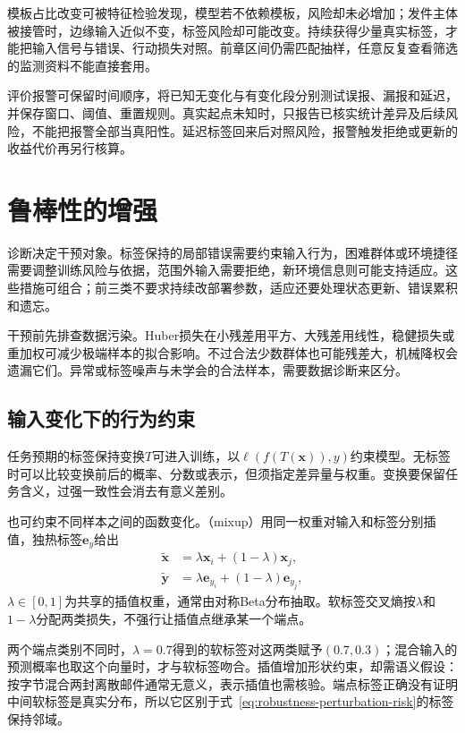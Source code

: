 模板占比改变可被特征检验发现，模型若不依赖模板，风险却未必增加；发件主体被接管时，边缘输入近似不变，标签风险却可能改变。持续获得少量真实标签，才能把输入信号与错误、行动损失对照。前章区间仍需匹配抽样，任意反复查看筛选的监测资料不能直接套用。

评价报警可保留时间顺序，将已知无变化与有变化段分别测试误报、漏报和延迟，并保存窗口、阈值、重置规则。真实起点未知时，只报告已核实统计差异及后续风险，不能把报警全部当真阳性。延迟标签回来后对照风险，报警触发拒绝或更新的收益代价再另行核算。

\section{鲁棒性的增强}
\label{sec:robustness-enhancement}

诊断决定干预对象。标签保持的局部错误需要约束输入行为，困难群体或环境捷径需要调整训练风险与依据，范围外输入需要拒绝，新环境信息则可能支持适应。这些措施可组合；前三类不要求持续改部署参数，适应还要处理状态更新、错误累积和遗忘。

干预前先排查数据污染。Huber损失在小残差用平方、大残差用线性，稳健损失或重加权可减少极端样本的拟合影响。不过合法少数群体也可能残差大，机械降权会遗漏它们。异常或标签噪声与未学会的合法样本，需要数据诊断来区分。

\subsection{输入变化下的行为约束}
\label{sec:robustness-local-enhancement}

任务预期的标签保持变换$T$可进入训练，以$\ell(f(T(\bm{x})),y)$约束模型。无标签时可以比较变换前后的概率、分数或表示，但须指定差异量与权重。变换要保留任务含义，过强一致性会消去有意义差别。

也可约束不同样本之间的函数变化。（mixup）用同一权重对输入和标签分别插值，独热标签$\bm{e}_y$给出
\begin{equation}
 \begin{aligned}
  \widetilde{\bm{x}}&=\lambda\bm{x}_i+(1-\lambda)\bm{x}_j,\\
  \widetilde{\bm{y}}&=\lambda\bm{e}_{y_i}
                         +(1-\lambda)\bm{e}_{y_j},
 \end{aligned}
 \label{eq:robustness-mixup}
\end{equation}
$\lambda\in[0,1]$为共享的插值权重，通常由对称Beta分布抽取。软标签交叉熵按$\lambda$和$1-\lambda$分配两类损失，不强行让插值点继承某一个端点。

两个端点类别不同时，$\lambda=0.7$得到的软标签对这两类赋予$(0.7,0.3)$；混合输入的预测概率也取这个向量时，才与软标签吻合。插值增加形状约束，却需语义假设：按字节混合两封离散邮件通常无意义，表示插值也需核验。端点标签正确没有证明中间软标签是真实分布，所以它区别于式~\eqref{eq:robustness-perturbation-risk}的标签保持邻域。

